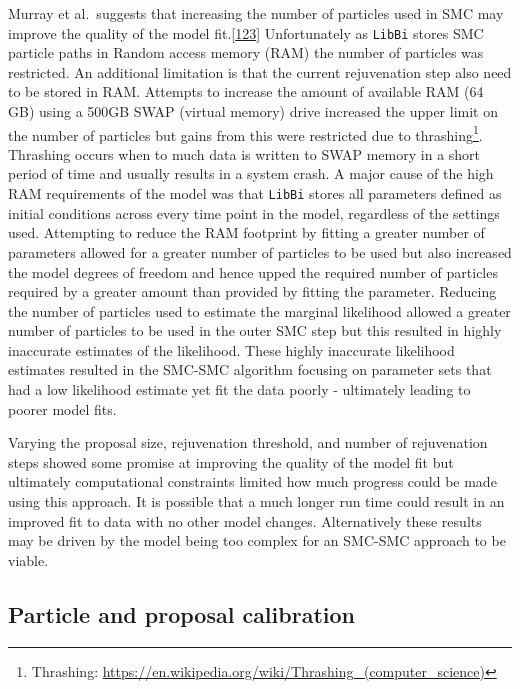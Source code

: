 \documentclass[11pt,twoside]{bristolthesis}
\begin{document}
  Murray et al.~suggests that increasing the number of particles used in SMC may improve the quality of the model fit.{[}\protect\hyperlink{ref-Murray2015}{123}{]} Unfortunately as \texttt{LibBi} stores SMC particle paths in Random access memory (RAM) the number of particles was restricted. An additional limitation is that the current rejuvenation step also need to be stored in RAM. Attempts to increase the amount of available RAM (64 GB) using a 500GB SWAP (virtual memory) drive increased the upper limit on the number of particles but gains from this were restricted due to thrashing\footnote{Thrashing: \url{https://en.wikipedia.org/wiki/Thrashing_(computer_science)}}. Thrashing occurs when to much data is written to SWAP memory in a short period of time and usually results in a system crash. A major cause of the high RAM requirements of the model was that \texttt{LibBi} stores all parameters defined as initial conditions across every time point in the model, regardless of the settings used. Attempting to reduce the RAM footprint by fitting a greater number of parameters allowed for a greater number of particles to be used but also increased the model degrees of freedom and hence upped the required number of particles required by a greater amount than provided by fitting the parameter. Reducing the number of particles used to estimate the marginal likelihood allowed a greater number of particles to be used in the outer SMC step but this resulted in highly inaccurate estimates of the likelihood. These highly inaccurate likelihood estimates resulted in the SMC-SMC algorithm focusing on parameter sets that had a low likelihood estimate yet fit the data poorly - ultimately leading to poorer model fits.
  
  Varying the proposal size, rejuvenation threshold, and number of rejuvenation steps showed some promise at improving the quality of the model fit but ultimately computational constraints limited how much progress could be made using this approach. It is possible that a much longer run time could result in an improved fit to data with no other model changes. Alternatively these results may be driven by the model being too complex for an SMC-SMC approach to be viable.
  
  \hypertarget{particle-and-proposal-calibration}{%
  \subsection{Particle and proposal calibration}\label{particle-and-proposal-calibration}}
  
\end{document}
